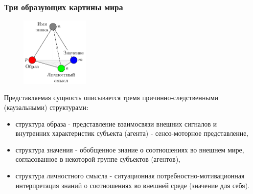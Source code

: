 \documentclass[default]{beamer}
\begin{document}
	
	\begin{frame}
		\frametitle{Три образующих картины мира}
		\footnotesize
		\begin{figure}
			\includegraphics[width=0.3\textwidth]{signs/sign_colored}
		\end{figure}
		
		Представляемая сущность описывается тремя причинно-следственными (каузальными) структурами:
		\begin{itemize}
			\item {\color{red}структура образа} - представление взаимосвязи внешних сигналов и внутренних характеристик субъекта (агента) - сенсо-моторное представление,
			\item {\color{blue}структура значения} - обобщенное знание о соотношениях во внешнем мире, согласованное в некоторой группе субъектов (агентов),
			\item {\color{green!60!black}структура личностного смысла} - ситуационная потребностно-мотивационная интерпретация знаний о соотношениях во внешней среде (значение для себя).
		\end{itemize}
	\end{frame}
\end{document}
